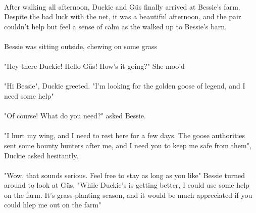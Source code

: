 \documentclass[a4paper,11pt ]{book}
\begin{document}
 \paragraph{} After walking all afternoon, Duckie and Güs finally arrived at Bessie's farm. Despite the bad luck with the net, it was a beautiful afternoon, and the pair couldn't help but feel a sense of calm as the walked up to Bessie's barn.
 \paragraph{} Bessie was sitting outside, chewing on some grass 
 \paragraph{} "Hey there Duckie! Hello Güs! How's it going?" She moo'd
 \paragraph{} "Hi Bessie", Duckie greeted. "I'm looking for the golden goose of legend, and I need some help"
 \paragraph{} "Of course! What do you need?" asked Bessie.
 \paragraph{} "I hurt my wing, and I need to rest here for a few days. The goose authorities sent some bounty hunters after me, and I need you to keep me safe from them", Duckie asked hesitantly.
 \paragraph{} "Wow, that sounds serious. Feel free to stay as long as you like" Bessie turned around to look at Güs.  "While Duckie's is getting better, I could use some help on the farm. It's grass-planting season, and it would be much appreciated if you could hlep me out on the farm"
\end{document}

